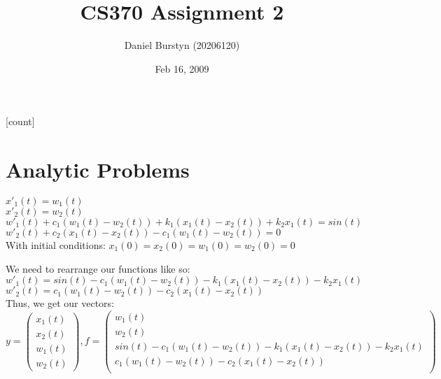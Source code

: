 \documentclass[12pt]{article}
\title{CS370 Assignment 2}
\author{Daniel Burstyn (20206120)}
\date{Feb 16, 2009}
\begin{document}
\maketitle
{}
[count]
\section{Analytic Problems}
\begin{list}{.}{}

\item 
\begin{list}{)}{}

\item 
$x'_1(t) = w_1(t)$\\
$x'_2(t) = w_2(t)$\\
$w'_1(t) + c_1(w_1(t) - w_2(t)) + k_1(x_1(t) -  x_2(t)) + k_2x_1(t) = sin(t)$\\
$w'_2(t) + c_2(x_1(t) - x_2(t)) - c_1(w_1(t) - w_2(t)) = 0$\\
With initial conditions: $x_1(0)=x_2(0)=w_1(0)=w_2(0)=0$

\item
We need to rearrange our functions like so:\\
$w'_1(t) = sin(t) - c_1(w_1(t) - w_2(t)) - k_1(x_1(t) -  x_2(t)) - k_2x_1(t)$\\
$w'_2(t) = c_1(w_1(t) - w_2(t)) - c_2(x_1(t) - x_2(t))$\\
Thus, we get our vectors:\\
$y = \left(
\begin{array}{c}
x_1(t)\\ x_2(t)\\ w_1(t)\\ w_2(t)
\end{array} \right),
f = \left(
\begin{array}{l}
w_1(t)\\
w_2(t)\\
sin(t) - c_1(w_1(t) - w_2(t)) - k_1(x_1(t) -  x_2(t)) - k_2x_1(t)\\
c_1(w_1(t) - w_2(t)) - c_2(x_1(t) - x_2(t))\\
\end{array} \right)$
\end{list}


\end{list}
\end{document}
